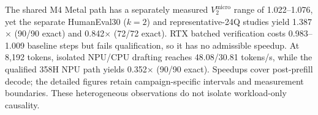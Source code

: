 The shared M4 Metal path has a separately measured $V_2^{\mathrm{micro}}$ range of 1.022--1.076, yet the separate HumanEval30 ($k=2$) and representative-24Q studies yield 1.387$\times$ (90/90 exact) and 0.842$\times$ (72/72 exact). RTX batched verification costs 0.983--1.009 baseline steps but fails qualification, so it has no admissible speedup. At 8,192 tokens, isolated NPU/CPU drafting reaches 48.08/30.81 tokens/s, while the qualified 358H NPU path yields 0.352$\times$ (90/90 exact). Speedups cover post-prefill decode; the detailed figures retain campaign-specific intervals and measurement boundaries. These heterogeneous observations do not isolate workload-only causality.
